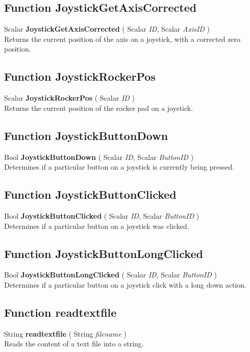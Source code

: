 \subsection{Function JoystickGetAxisCorrected \label{F:JoystickGetAxisCorrected}}
Scalar \textbf{JoystickGetAxisCorrected} ( Scalar \textit{ID}, Scalar \textit{AxisID} ) \\
Returns the current position of the axis on a joystick, with a corrected zero position.

\subsection{Function JoystickRockerPos \label{F:JoystickRockerPos}}
Scalar \textbf{JoystickRockerPos} ( Scalar \textit{ID} ) \\
Returns the current position of the rocker pad on a joystick.

\subsection{Function JoystickButtonDown \label{F:JoystickButtonDown}}
Bool \textbf{JoystickButtonDown} ( Scalar \textit{ID}, Scalar \textit{ButtonID} ) \\
Determines if a particular button on a joystick is currently being pressed.

\subsection{Function JoystickButtonClicked \label{F:JoystickButtonClicked}}
Bool \textbf{JoystickButtonClicked} ( Scalar \textit{ID}, Scalar \textit{ButtonID} ) \\
Determines if a particular button on a joystick was clicked.

\subsection{Function JoystickButtonLongClicked \label{F:JoystickButtonLongClicked}}
Bool \textbf{JoystickButtonLongClicked} ( Scalar \textit{ID}, Scalar \textit{ButtonID} ) \\
Determines if a particular button on a joystick click with a long down action.

\subsection{Function readtextfile \label{F:readtextfile}}
String \textbf{readtextfile} ( String \textit{filename} ) \\
Reads the content of a text file into a string.

